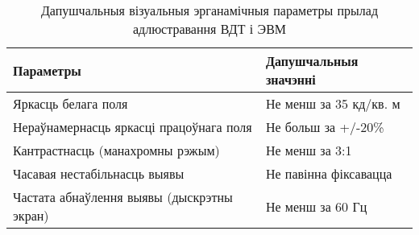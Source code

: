 \begin{table}[htp]
    \caption{Дапушчальныя візуальныя эрганамічныя параметры прылад
    адлюстравання ВДТ і ЭВМ}
    \begin{tabularx}{\textwidth}{ | >{\centering\arraybackslash}X
                                  | >{\centering\arraybackslash}X | }
    \hline
        Параметры & Дапушчальныя значэнні \\
    \hline
        Яркасць белага поля & Не менш за 35 кд/кв. м \\
    \hline
        Нераўнамернасць яркасці працоўнага поля & Не больш за +/-20\% \\
    \hline
         Кантрастнасць (манахромны рэжым) & Не менш за 3:1 \\
    \hline
        Часавая нестабільнасць выявы & Не павінна фіксавацца \\
    \hline
        Частата абнаўлення выявы (дыскрэтны экран) & Не менш за 60 Гц \\
    \hline
    \end{tabularx}
    \label{table: healthy4}
\end{table}

